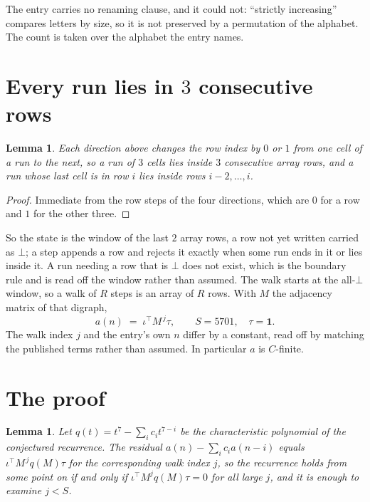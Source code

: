 \documentclass[11pt,a4paper]{article}
\theoremstyle{plain}
\newtheorem{lemma}[theorem]{Lemma}
\theoremstyle{definition}
\begin{document}
The entry carries no renaming clause, and it could not: ``strictly increasing'' compares
letters by size, so it is not preserved by a permutation of the alphabet. The count is taken
over the alphabet the entry names.

\section{Every run lies in $3$ consecutive rows}

\begin{lemma}\label{lem:win}
Each direction above changes the row index by $0$ or $1$ from one cell of a run to the next, so
a run of $3$ cells lies inside $3$ consecutive array rows, and a run whose last cell is in
row $i$ lies inside rows $i-2,\dots,i$.
\end{lemma}

\begin{proof}
Immediate from the row steps of the four directions, which are $0$ for a row and $1$ for the
other three.
\end{proof}

So the state is the window of the last $2$ array rows, a row not yet written carried as
$\bot$; a step appends a row and rejects it exactly when some run ends in it or lies inside it.
A run needing a row that is $\bot$ does not exist, which is the boundary rule and is read off
the window rather than assumed. The walk starts at the all-$\bot$ window, so a walk of $R$ steps
is an array of $R$ rows. With $M$ the adjacency matrix of that digraph,
\[
a(n)\;=\;\iota^{\!\top}M^{\,j}\tau ,\qquad S=5701,\quad\tau=\mathbf{1} .
\]
The walk index $j$ and the entry's own $n$ differ by a constant, read off by matching the
published terms rather than assumed. In particular $a$ is $C$-finite.

\section{The proof}

\begin{lemma}\label{lem:crit}
Let $q(t)=t^{7}-\sum_i c_it^{7-i}$ be the characteristic polynomial of the
conjectured recurrence. The residual $a(n)-\sum_ic_ia(n-i)$ equals
$\iota^{\!\top}M^{\,j}q(M)\tau$ for the corresponding walk index $j$, so the recurrence
holds from some point on if and only if $\iota^{\!\top}M^{j}q(M)\tau=0$ for all large $j$,
and it is enough to examine $j<S$.
\end{lemma}
\end{document}
